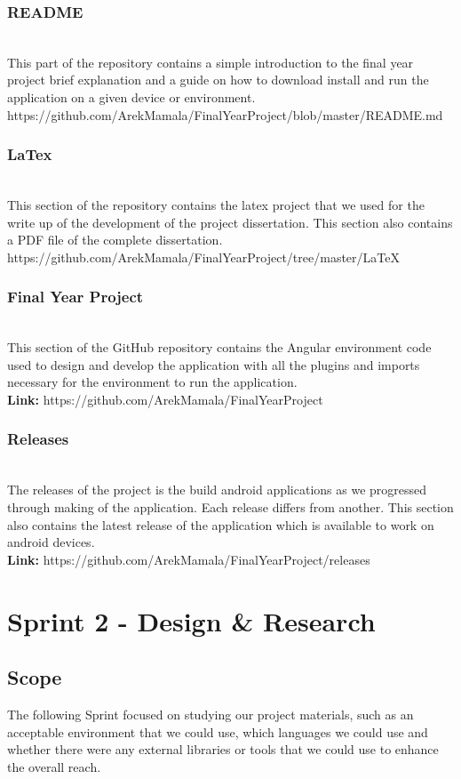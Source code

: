 \documentclass[a4paper,12pt]{report}
\begin{document}
\subsubsection{README}\\
This part of the repository contains a simple introduction to the final year project brief explanation and a guide on how to download  install and run the application on a given device or environment.\\
https://github.com/ArekMamala/FinalYearProject/blob/master/README.md

\subsubsection{LaTex}\\
This section of the repository contains the latex project that we used for the write up of the development of the project dissertation. This section also contains a PDF file of the complete dissertation.\\  
https://github.com/ArekMamala/FinalYearProject/tree/master/LaTeX

\subsubsection{Final Year Project}\\
This section of the GitHub repository contains the Angular environment code used to design and develop the application with all the plugins and imports necessary for the environment to run the application.\\
\textbf{Link:} https://github.com/ArekMamala/FinalYearProject

\subsubsection{Releases}\\
The releases of the project is the build android applications as we progressed through making of the application. Each release differs from another. This section also contains the latest release of the application which is available to work on android devices.\\
\textbf{Link:} https://github.com/ArekMamala/FinalYearProject/releases


\section{Sprint 2 - Design & Research}
\subsection{Scope}
The following Sprint focused on studying our project materials, such as an acceptable environment that we could use, which languages we could use and whether there were any external libraries or tools that we could use to enhance the overall reach.
\end{document}
